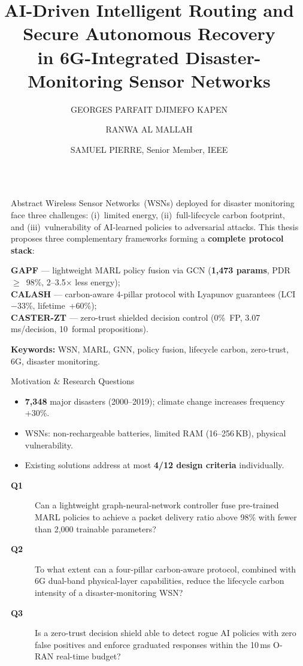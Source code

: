 \documentclass[final]{beamer}
\title{AI-Driven Intelligent Routing and Secure Autonomous Recovery\\in 6G-Integrated Disaster-Monitoring Sensor Networks}
\author{\uppercase{Georges Parfait Djimefo Kapen} \inst{1} \and
\uppercase{Ranwa Al Mallah} \inst{1} \and
\uppercase{Samuel Pierre}, Senior Member, IEEE \inst{1}}
\institute[shortinst]{Mobile Computing and Networking Research Laboratory (LARIM), Department of Computer and Software Engineering, Polytechnique Montr\'{e}al, Montreal,
QC H3T 1J4, Canada}
\newlength{\sepwidth}
\newlength{\colwidth}
\newcommand{\separatorcolumn}{\begin{column}{\sepwidth}\end{column}}
\begin{document}
\begin{frame}[t]
\begin{columns}[t]
\separatorcolumn

\begin{column}{\colwidth}

  \begin{block}{Abstract}
    Wireless Sensor Networks~(WSNs) deployed for disaster monitoring face three challenges: (i)~limited energy, (ii)~full-lifecycle carbon footprint, and (iii)~vulnerability of AI-learned policies to adversarial attacks.
    This thesis proposes three complementary frameworks forming a \textbf{complete protocol stack}:

    \smallskip
    \textbf{GAPF} --- lightweight MARL policy fusion via GCN (\textbf{1,473 params}, PDR~$\geq$~98\%, 2--3.5$\times$ less energy);\\
    \textbf{CALASH} --- carbon-aware 4-pillar protocol with Lyapunov guarantees (LCI~$-$33\%, lifetime~+60\%);\\
    \textbf{CASTER-ZT} --- zero-trust shielded decision control (0\%~FP, 3.07\,ms/decision, 10~formal propositions).

    \smallskip
    \textbf{Keywords:} WSN, MARL, GNN, policy fusion, lifecycle carbon, zero-trust, 6G, disaster monitoring.
  \end{block}

  \begin{block}{Motivation \& Research Questions}
    \begin{itemize}
      \item \textbf{7,348} major disasters (2000--2019); climate change increases frequency +30\%.
      \item WSNs: non-rechargeable batteries, limited RAM (16--256\,KB), physical vulnerability.
      \item Existing solutions address at most \textbf{4/12 design criteria} individually.
    \end{itemize}

    \begin{description}
      \item[\textbf{Q1}] Can a lightweight graph-neural-network controller fuse pre-trained MARL policies to achieve a packet delivery ratio above 98\% with fewer than 2,000 trainable parameters?
      \item[\textbf{Q2}] To what extent can a four-pillar carbon-aware protocol, combined with 6G dual-band physical-layer capabilities, reduce the lifecycle carbon intensity of a disaster-monitoring WSN?
      \item[\textbf{Q3}] Is a zero-trust decision shield able to detect rogue AI policies with zero false positives and enforce graduated responses within the 10\,ms O-RAN real-time budget?
    \end{description}
  \end{block}


\end{column}
\end{columns}
\end{frame}
\end{document}
